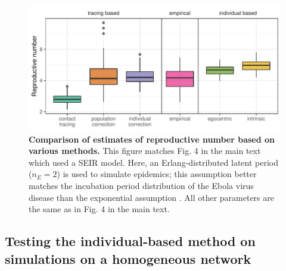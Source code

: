 \documentclass[12pt]{article}
\begin{document}
\begin{figure}[!h]
\includegraphics[width=\textwidth]{../fig/cmp_reproductive_seminr.pdf}
\caption{\textbf{Comparison of estimates of reproductive number based on various methods.}
This figure matches Fig. 4 in the main text which used a SEIR model.
Here, an Erlang-distributed latent period ($n_E=2$) is used to simulate epidemics; this assumption better matches the incubation period distribution of the Ebola virus disease than the exponential assumption \citep{who2014ebola}.
All other parameters are the same as in Fig. 4 in the main text.
}
\label{fig:cmpseminir}
\end{figure}

\pagebreak

\subsection{Testing the individual-based method on simulations on a homogeneous network}
\end{document}
